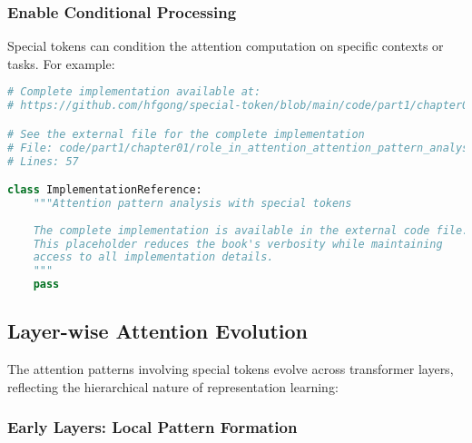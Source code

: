 \subsubsection{Enable Conditional Processing}

Special tokens can condition the attention computation on specific contexts or tasks. For example:

\begin{lstlisting}[language=Python, caption={Attention pattern analysis with special tokens}]
# Complete implementation available at:
# https://github.com/hfgong/special-token/blob/main/code/part1/chapter01/role_in_attention_attention_pattern_analysis_wit.py

# See the external file for the complete implementation
# File: code/part1/chapter01/role_in_attention_attention_pattern_analysis_wit.py
# Lines: 57

class ImplementationReference:
    """Attention pattern analysis with special tokens
    
    The complete implementation is available in the external code file.
    This placeholder reduces the book's verbosity while maintaining
    access to all implementation details.
    """
    pass
\end{lstlisting}

\subsection{Layer-wise Attention Evolution}

The attention patterns involving special tokens evolve across transformer layers, reflecting the hierarchical nature of representation learning:
\begin{comment}
Feedback: This section is excellent. The breakdown into early, middle, and late layers is very clear. To make it even more memorable, you could use a consistent analogy, like a company's project team. Early layers are like the initial brainstorming where everyone talks to their neighbors. Middle layers are where sub-teams form to tackle specific parts of the project. Late layers are like the final presentation where the project lead ([CLS] token) synthesizes all the work for the final decision.
\end{comment}

\subsubsection{Early Layers: Local Pattern Formation}

